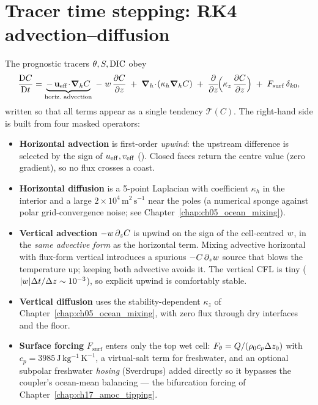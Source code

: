 \section{Tracer time stepping: RK4 advection--diffusion}

The prognostic tracers $\theta,S,\mathrm{DIC}$ obey
\begin{equation}
  \Dt{C} = \underbrace{-\,\uvec_{\mathrm{eff}}\!\cdot\!\grad_h C}_{\text{horiz.\ advection}}
           \;-\; \ww\,\pd{C}{z}
           \;+\; \grad_h\!\cdot\!(\kappa_h\grad_h C)
           \;+\; \pd{}{z}\!\Big(\kappa_z\,\pd{C}{z}\Big)
           \;+\; F_{\mathrm{surf}}\,\delta_{k0},
  \label{eq:tracer}
\end{equation}
written so that all terms appear as a single tendency $\mathcal{T}(C)$. The
right-hand side is built from four masked operators:

\begin{itemize}
\item \textbf{Horizontal advection} is first-order \emph{upwind}: the upstream
difference is selected by the sign of $u_{\mathrm{eff}},v_{\mathrm{eff}}$
(). Closed faces return the centre value (zero gradient), so no flux
crosses a coast.
\item \textbf{Horizontal diffusion} is a 5-point Laplacian with coefficient
$\kappa_h$ in the interior and a large $2\times10^4\,\mathrm{m^2\,s^{-1}}$ near the
poles (a numerical sponge against polar grid-convergence noise; see
Chapter~\ref{chap:ch05_ocean_mixing}).
\item \textbf{Vertical advection} $-w\,\partial_z C$ is upwind on the sign of the
cell-centred $w$, in the \emph{same advective form} as the horizontal term. Mixing
advective horizontal with flux-form vertical introduces a spurious $-C\,\partial_z
w$ source that blows the temperature up; keeping both advective avoids it. The
vertical CFL is tiny ($|w|\Delta t/\Delta z\sim 10^{-3}$), so explicit upwind is
comfortably stable.
\item \textbf{Vertical diffusion} uses the stability-dependent $\kappa_z$ of
Chapter~\ref{chap:ch05_ocean_mixing}, with zero flux through dry interfaces and the
floor.
\item \textbf{Surface forcing} $F_{\mathrm{surf}}$ enters only the top wet cell:
$F_\theta = Q/(\rho_0 c_p\Delta z_0)$ with $c_p=3985\,\mathrm{J\,kg^{-1}\,K^{-1}}$,
a virtual-salt term for freshwater, and an optional subpolar freshwater
\emph{hosing} (Sverdrups) added directly so it bypasses the coupler's ocean-mean
balancing --- the bifurcation forcing of Chapter~\ref{chap:ch17_amoc_tipping}.
\end{itemize}

